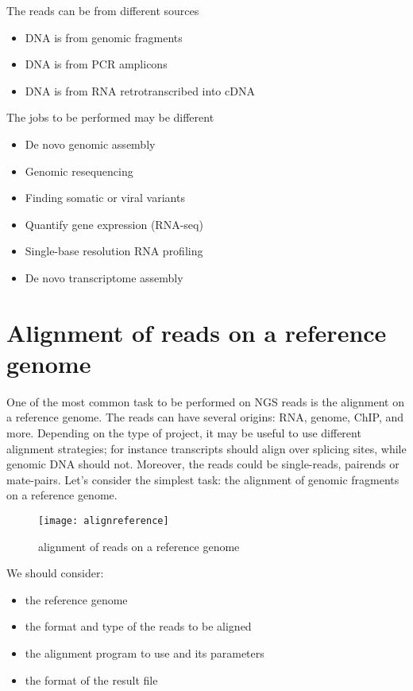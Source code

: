 The reads can be from different sources

\begin{itemize}
	\item DNA is from genomic fragments
	\item DNA is from PCR amplicons
	\item DNA is from RNA retrotranscribed into cDNA
\end{itemize}

The jobs to be performed may be different

\begin{itemize}
	\item De novo genomic assembly
	\item Genomic resequencing
	\item Finding somatic or viral variants
	\item Quantify gene expression (RNA-seq)
	\item Single-base resolution RNA profiling
	\item De novo transcriptome assembly 
\end{itemize}

\section{Alignment of reads on a reference genome}

One of the most common task to be performed on NGS reads is the alignment on a reference genome.
The reads can have several origins: RNA, genome, ChIP, and more.
Depending on the type of project, it may be useful to use different alignment strategies;
for instance transcripts should align over splicing sites,
while genomic DNA should not.
Moreover, the reads could be single-reads, pairends or mate-pairs.
Let's consider the simplest task: the alignment of genomic fragments on a reference genome.

\begin{figure}[H]
  \centering
  \texttt{[image: alignreference]}
  \caption{alignment of reads on a reference genome}
  \label{fig:alignreference}
\end{figure}

We should consider:
\begin{itemize}
	\item the reference genome
	\item the format and type of the reads to be aligned
	\item the alignment program to use and its parameters 
	\item the format of the result file
\end{itemize}

